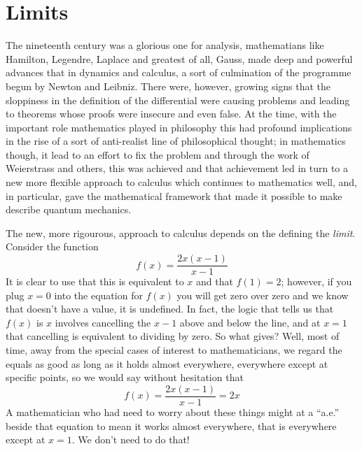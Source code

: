 \documentclass[12pt]{article}
\begin{document}
\section*{Limits}

The nineteenth century was a glorious one for analysis, mathematians
like Hamilton, Legendre, Laplace and greatest of all, Gauss, made deep
and powerful advances that in dynamics and calculus, a sort of
culmination of the programme begun by Newton and Leibniz. There were,
however, growing signs that the sloppiness in the definition of the
differential were causing problems and leading to theorems whose
proofs were insecure and even false. At the time, with the important
role mathematics played in philosophy this had profound implications
in the rise of a sort of anti-realist line of philosophical thought;
in mathematics though, it lead to an effort to fix the problem and
through the work of Weierstrass and others, this was achieved and that
achievement led in turn to a new more flexible approach to calculus
which continues to mathematics well, and, in particular, gave the
mathematical framework that made it possible to make describe quantum
mechanics.

The new, more rigourous, approach to calculus depends on the defining the \textsl{limit}. Consider the function
\begin{equation}
  f(x)=\frac{2x(x-1)}{x-1}
\end{equation}
It is clear to use that this is equivalent to $x$ and that $f(1)=2$;
however, if you plug $x=0$ into the equation for $f(x)$ you will get
zero over zero and we know that doesn't have a value, it is
undefined. In fact, the logic that tells us that $f(x)$ is $x$
involves cancelling the $x-1$ above and below the line, and at $x=1$
that cancelling is equivalent to dividing by zero. So what gives?
Well, most of time, away from the special cases of interest to
mathematicians, we regard the equals as good as long as it holds
almost everywhere, everywhere except at specific points, so we would
say without hesitation that
\begin{equation}
  f(x)=\frac{2x(x-1)}{x-1}=2x
\end{equation}
A mathematician who had need to worry about these things might at a
``a.e.'' beside that equation to mean it works almost everywhere, that
is everywhere except at $x=1$. We don't need to do that!
\end{document}
